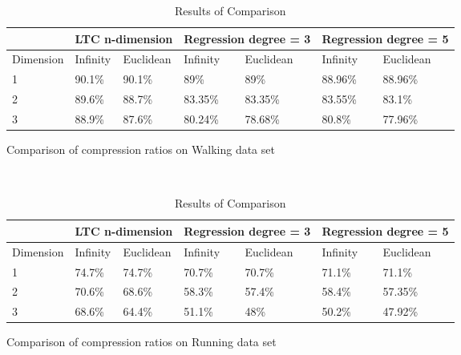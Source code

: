 
\begin{table}
\begin{subfigure}{\columnwidth}
\centering
\begin{tabular}{|l|l|l|l|l|l|l|l|}
\hline
           & \multicolumn{2}{c|}{LTC n-dimension} & \multicolumn{2}{c|}{Regression degree = 3} & \multicolumn{3}{l|}{Regression degree = 5}\\ \hline
Dimension & Infinity   & Euclidean   & Infinity    & Euclidean     & Infinity      & \multicolumn{2}{l|}{Euclidean} \\ \hline
1          & 90.1\%     & 90.1\%      & 89\%        & 89\%          & 88.96\%       & \multicolumn{2}{l|}{88.96\%}   \\ \hline
2          & 89.6\%     & 88.7\%      & 83.35\%     & 83.35\%       & 83.55\%       & \multicolumn{2}{l|}{83.1\%}    \\ \hline
3          & 88.9\%     & 87.6\%      & 80.24\%     & 78.68\%       & 80.8\%        & \multicolumn{2}{l|}{77.96\%}   \\ \hline
\end{tabular}
\caption{Comparison of compression ratios on Walking data set}
\label{table:CR-compare-walking}
\end{subfigure}
\\
\begin{subfigure}{\columnwidth}
\centering
\begin{tabular}{|l|l|l|l|l|l|l|l|}
\hline
           & \multicolumn{2}{c|}{LTC n-dimension} & \multicolumn{2}{c|}{Regression degree = 3} & \multicolumn{3}{l|}{Regression degree = 5}          \\ \hline
Dimension & Infinity   & Euclidean   & Infinity            & Euclidean           & Infinity& \multicolumn{2}{l|}{Euclidean} \\ \hline
1          & 74.7\%     & 74.7\%      & 70.7\%      & 70.7\%        & 71.1\%        & \multicolumn{2}{l|}{71.1\%}    \\ \hline
2          & 70.6\%     & 68.6\%      & 58.3\%      & 57.4\%        & 58.4\%        & \multicolumn{2}{l|}{57.35\%}   \\ \hline
3          & 68.6\%     & 64.4\%      & 51.1\%      & 48\%          & 50.2\%        & \multicolumn{2}{l|}{47.92\%}   \\ \hline
\end{tabular}
\caption{Comparison of compression ratios on Running data set}
\label{table:CR-compare-running}
\end{subfigure}
\caption{Results of Comparison}
\end{table}
